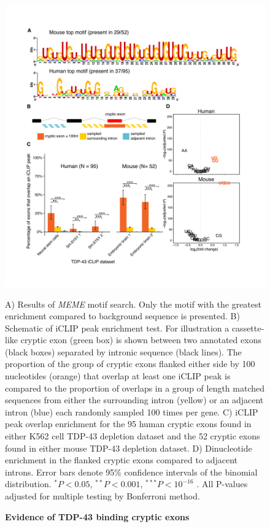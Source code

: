 \begin{figure}[h!]
	\centering
	\includegraphics[width=\textwidth]{Figures/03_cryptic_exons/Figure_2_motif_iCLIP.png} 
	\caption{\textbf{Evidence of TDP-43 binding cryptic exons}}
		A) Results of \emph{MEME} motif search. Only the motif with the greatest enrichment compared to background sequence is presented. B) Schematic of iCLIP peak enrichment test. For illustration a cassette-like cryptic exon (green box) is shown between two annotated exons (black boxes) separated by intronic sequence (black lines). The proportion of the group of cryptic exons flanked either side by 100 nucleotides (orange) that overlap at least one iCLIP peak is compared to the proportion of overlaps in a group of length matched sequences from either the surrounding intron (yellow) or an adjacent intron (blue) each randomly sampled 100 times per gene. C) iCLIP peak overlap enrichment for the 95 human cryptic exons found in either K562 cell TDP-43 depletion dataset and the 52 cryptic exons found in either mouse TDP-43 depletion dataset. D) Dinucleotide enrichment in the flanked cryptic exons compared to adjacent introns. Error bars denote 95\% confidence intervals of the binomial distribution. $^* P < 0.05 $, $^{**} P < 0.001$, $^{***} P < 10^{-16}$ . All P-values adjusted for multiple testing by Bonferroni method.
	\label{fig:cryptic_motifs}
\end{figure}


